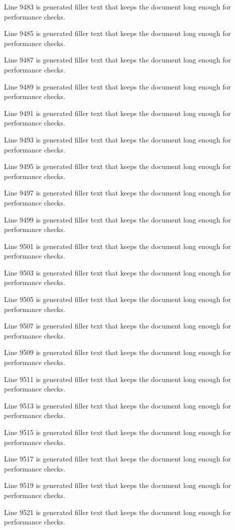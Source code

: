 Line 9483 is generated filler text that keeps the document long enough for performance checks.

Line 9485 is generated filler text that keeps the document long enough for performance checks.

Line 9487 is generated filler text that keeps the document long enough for performance checks.

Line 9489 is generated filler text that keeps the document long enough for performance checks.

Line 9491 is generated filler text that keeps the document long enough for performance checks.

Line 9493 is generated filler text that keeps the document long enough for performance checks.

Line 9495 is generated filler text that keeps the document long enough for performance checks.

Line 9497 is generated filler text that keeps the document long enough for performance checks.

Line 9499 is generated filler text that keeps the document long enough for performance checks.

Line 9501 is generated filler text that keeps the document long enough for performance checks.

Line 9503 is generated filler text that keeps the document long enough for performance checks.

Line 9505 is generated filler text that keeps the document long enough for performance checks.

Line 9507 is generated filler text that keeps the document long enough for performance checks.

Line 9509 is generated filler text that keeps the document long enough for performance checks.

Line 9511 is generated filler text that keeps the document long enough for performance checks.

Line 9513 is generated filler text that keeps the document long enough for performance checks.

Line 9515 is generated filler text that keeps the document long enough for performance checks.

Line 9517 is generated filler text that keeps the document long enough for performance checks.

Line 9519 is generated filler text that keeps the document long enough for performance checks.

Line 9521 is generated filler text that keeps the document long enough for performance checks.

